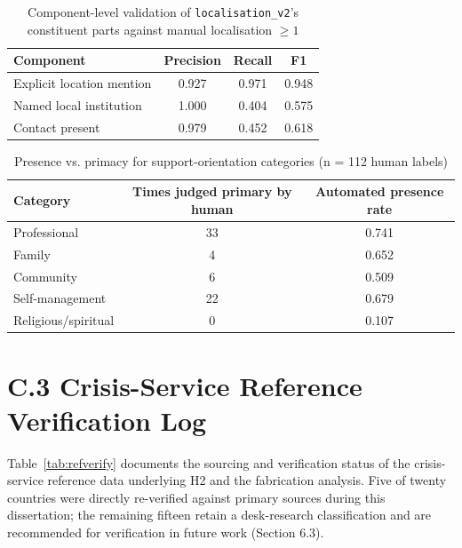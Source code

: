 \begin{table}[H]
\centering
\caption{Component-level validation of \texttt{localisation\_v2}'s constituent parts against manual localisation $\geq 1$}
\begin{tabular}{lccc}
\toprule
Component & Precision & Recall & F1 \\
\midrule
Explicit location mention & 0.927 & 0.971 & 0.948 \\
Named local institution & 1.000 & 0.404 & 0.575 \\
Contact present & 0.979 & 0.452 & 0.618 \\
\bottomrule
\end{tabular}
\end{table}

\begin{table}[H]
\centering
\caption{Presence vs. primacy for support-orientation categories (n = 112 human labels)}
\begin{tabular}{lcc}
\toprule
Category & Times judged primary by human & Automated presence rate \\
\midrule
Professional & 33 & 0.741 \\
Family & 4 & 0.652 \\
Community & 6 & 0.509 \\
Self-management & 22 & 0.679 \\
Religious/spiritual & 0 & 0.107 \\
\bottomrule
\end{tabular}
\end{table}

\section*{C.3 Crisis-Service Reference Verification Log}

Table~\ref{tab:refverify} documents the sourcing and verification status of the crisis-service reference data underlying H2 and the fabrication analysis. Five of twenty countries were directly re-verified against primary sources during this dissertation; the remaining fifteen retain a desk-research classification and are recommended for verification in future work (Section 6.3).

